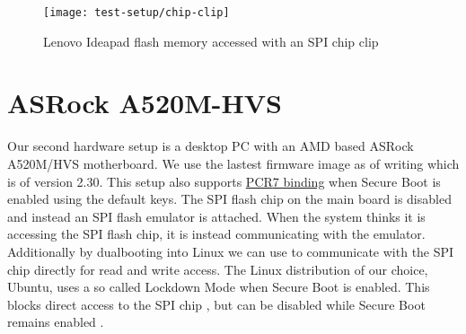 \begin{figure}[htb]
    \centering
    \texttt{[image: test-setup/chip-clip]}
    \caption{Lenovo Ideapad flash memory accessed with an \acs{SPI} chip clip}
    \label{fig:lenovo-clamp}
\end{figure}

\section{ASRock A520M-HVS}
\label{sec:test-setup:asrock}

Our second hardware setup is a desktop \ac{PC} with an \ac{AMD} based ASRock A520M\-/HVS motherboard.
We use the lastest firmware image as of writing which is of version 2.30.
This setup also supports \hyperlink{pcr7-binding}{\ac{PCR}7 binding} when Secure Boot is enabled using the default keys.
The \ac{SPI} flash chip on the main board is disabled and instead an  \ac{SPI} flash emulator is attached.
When the system thinks it is accessing the \ac{SPI} flash chip, it is instead communicating with the emulator.
Additionally by dualbooting into Linux we can use  to communicate with the \ac{SPI} chip directly for read and write access.
The Linux distribution of our choice, Ubuntu, uses a so called Lockdown Mode when Secure Boot is enabled.
This blocks direct access to the \ac{SPI} chip \cite{man-kernel-lockdown}, but can be disabled while Secure Boot remains enabled \cite{disable-kernel-lockdown}.
